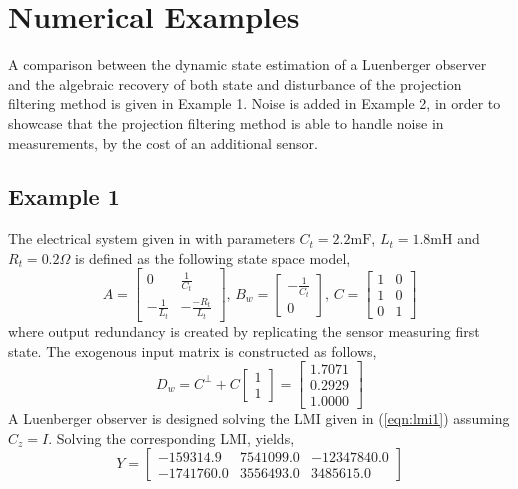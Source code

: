 \documentclass[pdflatex,sn-mathphys-num]{sn-jnl}%
\theoremstyle{thmstyleone}%
\theoremstyle{thmstyletwo}%
\theoremstyle{thmstylethree}%
\begin{document}
\section{Numerical Examples}
A comparison between the dynamic state estimation of a Luenberger observer and the algebraic recovery of both state and disturbance of the projection filtering method is given in Example 1. Noise is added in Example 2, in order to showcase that the projection filtering method is able to handle noise in measurements, by the cost of an additional sensor. 
\subsection{Example 1}
The electrical system given in\cite{yang2025output} with parameters $C_t=2.2\mathrm{mF}$, $L_t=1.8\mathrm{mH}$ and $R_t=0.2\Omega$ is defined as the following state space model,
\begin{equation}
A=\begin{bmatrix}
    0& \frac{1}{C_t}\\
    -\frac{1}{L_t}& -\frac{-R_t}{L_t}    
\end{bmatrix},\,
B_w=\begin{bmatrix}
    -\frac{1}{C_t}\\
    0    
\end{bmatrix},\,
C=\begin{bmatrix}
    1& 0\\    
    1& 0\\    
    0& 1    
\end{bmatrix}
\end{equation}
where output redundancy is created by replicating the sensor measuring first state. The exogenous input matrix is constructed as follows,
\begin{equation}
    D_w=C^\perp+C\begin{bmatrix}1\\1\end{bmatrix}=\begin{bmatrix}
    1.7071\\
    0.2929\\
    1.0000
    \end{bmatrix}
\end{equation}
A Luenberger observer is designed solving the LMI given in (\ref{eqn:lmi1}) assuming $C_z=I$. Solving the corresponding LMI, yields,
\begin{equation}
    Y=\begin{bmatrix}
 -159314.9& 7541099.0& -12347840.0\\
-1741760.0& 3556493.0&   3485615.0
    \end{bmatrix}
\end{equation}
\end{document}

